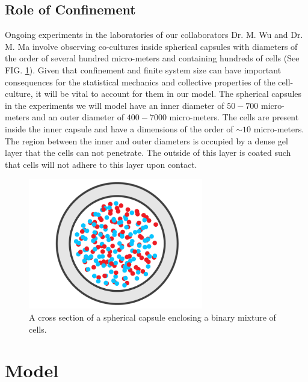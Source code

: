 \documentclass[aps,prb,twocolumn,groupedaddress,nofootinbib,floatfix]{revtex4}
\begin{document}
\subsection{Role of Confinement}

Ongoing experiments in the laboratories of our collaborators Dr. M. Wu and Dr. M. Ma involve observing co-cultures inside spherical capsules with diameters of the order of several hundred micro-meters 
and containing hundreds of cells\cite{Alessandri} (See FIG. \ref{fig:capsule}). Given that confinement and finite system size can have important consequences for the statistical mechanics and collective 
properties of the cell-culture, it will be vital to account for them in our model. The spherical capsules in the experiments we will model have an inner diameter of $50-700$ micro-meters and an outer diameter of $400-7000$ micro-meters.
The cells are present inside the inner capsule and have a dimensions of the order of $\sim 10$ micro-meters. The region between the inner and outer diameters is occupied by a dense gel layer that the cells can not penetrate.
The outside of this layer is coated such that cells will not adhere to this layer upon contact. \\

\begin{figure}
  \includegraphics[width=3in]{images/Fig1.png}
  \caption[capsule]
   {A cross section of a spherical capsule enclosing a binary mixture of 
   cells.}
   \label{fig:capsule}
\end{figure}


\section{Model}
\end{document}
